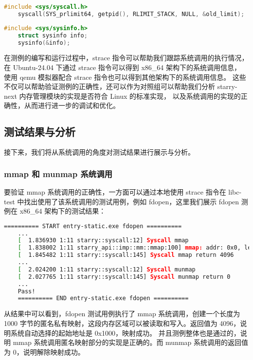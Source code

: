 \begin{lstlisting}[language=c, caption=prlimit64]
    #include <sys/syscall.h>
    syscall(SYS_prlimit64, getpid(), RLIMIT_STACK, NULL, &old_limit);
\end{lstlisting}

\begin{lstlisting}[language=c, caption=sysinfo]
    #include <sys/sysinfo.h>
    struct sysinfo info;
    sysinfo(&info);
\end{lstlisting}

在测例的编写和运行过程中，strace 指令可以帮助我们跟踪系统调用的执行情况，在 Ubuntu-24.04 下通过 strace 指令可以得到 x86\_64 架构下的系统调用信息，
使用 qemu 模拟器配合 strace 指令也可以得到其他架构下的系统调用信息。
这些不仅可以帮助验证测例的正确性，还可以作为对照组可以帮助我们分析 starry-next 内存管理模块的实现是否符合 Linux 的标准实现，
以及系统调用的实现的正确性，从而进行进一步的调试和优化。

\subsection{测试结果与分析}

接下来，我们将从系统调用的角度对测试结果进行展示与分析。

\subsubsection{mmap 和 munmap 系统调用}

要验证 mmap 系统调用的正确性，一方面可以通过本地使用 strace 指令在 libc-test 中找出使用了该系统调用的测试用例，例如 fdopen，这里我们展示 fdopen 测例在 x86\_64 架构下的测试结果：
\begin{lstlisting}[language=bash, caption=fdopen 测试结果]
    ========== START entry-static.exe fdopen ==========
    ...
    [  1.836930 1:11 starry::syscall:12] Syscall mmap
    [  1.838002 1:11 starry_api::imp::mm::mmap:100] mmap: addr: 0x0, length: 1000, prot: MmapProt(PROT_READ | PROT_WRITE), flags: MmapFlags(MAP_PRIVATE | MAP_ANONYMOUS), fd0
    [  1.845482 1:11 starry::syscall:145] Syscall mmap return 4096
    ...
    [  2.024200 1:11 starry::syscall:12] Syscall munmap
    [  2.027765 1:11 starry::syscall:145] Syscall munmap return 0
    ...
    Pass!
    ========== END entry-static.exe fdopen ==========
\end{lstlisting}

从结果中可以看到，fdopen 测试用例执行了 mmap 系统调用，创建一个长度为 1000 字节的匿名私有映射，这段内存区域可以被读取和写入。返回值为 4096，说明系统自动选择的起始地址是 0x1000，映射成功。
并且测例整体也是通过的，说明 mmap 系统调用匿名映射部分的实现是正确的。而 munmap 系统调用的返回值为 0，说明解除映射成功。


